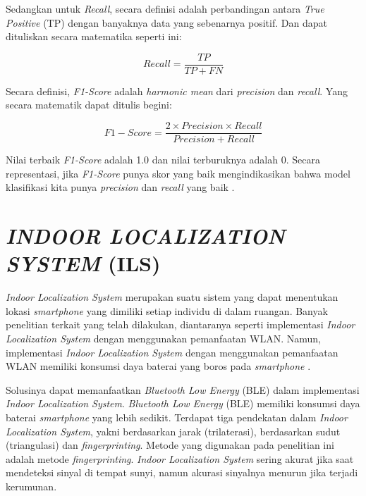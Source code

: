 Sedangkan untuk \textit{Recall}, secara definisi adalah perbandingan antara \textit{True Positive} (TP) dengan banyaknya data yang sebenarnya positif. Dan dapat dituliskan secara matematika seperti ini:

\begin{equation}
	\label{rumusrecall}
	Recall = \frac{TP}{TP+FN}
\end{equation}
\vspace{0.1cm}

Secara definisi, \textit{F1-Score} adalah \textit{harmonic mean} dari \textit{precision} dan \textit{recall}. Yang secara matematik dapat ditulis begini:

\begin{equation}
	\label{rumusf1score}
	F1-Score = \frac{2 \times Precision \times Recall}{Precision+Recall}
\end{equation}
\vspace{0.1cm}

Nilai terbaik \textit{F1-Score} adalah 1.0 dan nilai terburuknya adalah 0. Secara representasi, jika \textit{F1-Score} punya skor yang baik mengindikasikan bahwa model klasifikasi kita punya \textit{precision} dan \textit{recall} yang baik \citep{Ariza18}.


\section{\uppercase{\textit{INDOOR LOCALIZATION SYSTEM} (ILS)}}
\textit{Indoor Localization System} merupakan suatu sistem yang dapat menentukan lokasi \textit{smartphone} yang dimiliki setiap individu di dalam ruangan. Banyak penelitian terkait yang telah dilakukan, diantaranya seperti implementasi \textit{Indoor Localization System} dengan menggunakan pemanfaatan WLAN. Namun, implementasi \textit{Indoor Localization System} dengan menggunakan pemanfaatan WLAN memiliki konsumsi daya baterai yang boros pada \textit{smartphone} \citep{Sun2019}.
\par Solusinya dapat memanfaatkan \textit{Bluetooth Low Energy }(BLE) dalam implementasi \textit{Indoor Localization System}. \textit{Bluetooth Low Energy }(BLE) memiliki konsumsi daya baterai \textit{smartphone} yang lebih sedikit. Terdapat tiga pendekatan dalam \textit{Indoor Localization System}, yakni berdasarkan jarak (trilaterasi), berdasarkan sudut (triangulasi) dan \textit{fingerprinting}. Metode yang digunakan pada penelitian ini adalah metode \textit{fingerprinting}. \textit{Indoor Localization System} sering akurat jika saat mendeteksi sinyal di tempat sunyi, namun akurasi sinyalnya menurun jika terjadi kerumunan\citep{Santos2021}.

